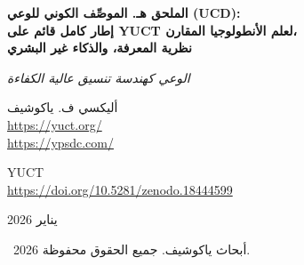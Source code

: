 \documentclass[12pt,a4paper]{article}
\DeclareRobustCommand{\alD}{\texorpdfstring{\ensuremath{\alpha_{\mathrm{D}}}}{alpha_D}}
\DeclareRobustCommand{\beI}{\texorpdfstring{\ensuremath{\beta_{\mathrm{I}}}}{beta_I}}
\DeclareRobustCommand{\gaR}{\texorpdfstring{\ensuremath{\gamma_{\mathrm{R}}}}{gamma_R}}
\newcommand{\eff}{\mathrm{eff}}
\newcommand{\Ke}{K_{\eff}}
\begin{document}
	
	\begin{titlepage}
		\begin{center}
			\vspace*{0cm}
			
			\Huge\textbf{الملحق هـ. الموصِّف الكوني للوعي (UCD):\\ إطار كامل قائم على YUCT لعلم الأنطولوجيا المقارن،\\ نظرية المعرفة، والذكاء غير البشري}
			
			\vspace{1cm}
			
			\small\textit{الوعي كهندسة تنسيق عالية الكفاءة}
			
			\vspace{1cm}
			\Large
			أليكسي ف. ياكوشيف\\
			
			\url{https://yuct.org/}\\
			\url{https://ypsdc.com/}
			
			\vspace{2cm}
			\large YUCT \\ 
			\url{https://doi.org/10.5281/zenodo.18444599}\\
			\vspace{1cm}
			
			\vspace{0cm}
			\large
			يناير 2026
			
			\vspace{6cm}
			\textcopyright~2026 أبحاث ياكوشيف. جميع الحقوق محفوظة.
			
			\newpage
			
			\begin{abstract}
				\noindent
				تقدم هذه الورقة إطار الوعي-المعرفة الموحد الكامل الذي يدمج الموصِّف الكوني للوعي (UCD) مع نظرية ياكوشيف الموحدة للتنسيق (YUCT). بناءً على الرؤية الأساسية بأن الوعي/الذكاء/العقل هو هندسة تنسيق عالية الكفاءة (\(\Ke \gg 1\))، نطور: (1) صياغة رياضية كاملة لثالوث \(\mathcal{D}+\mathcal{I}\cdot\mathcal{R}\) كتفكيك أساسي لأي عامل معرفي؛ (2) ثلاث معاملات طيفية (\alD, \beI, \gaR) للمقارنة الكمية عبر الأنواع والركائز؛ (3) نظرية المعرفة كمعالجة منسقة للمعلومات؛ (4) بروتوكولات تجريبية مفصلة لقياس الوعي في الأنظمة البيولوجية والاصطناعية وخارج الأرض؛ (5) تنبؤات محددة لبحث SETI 2.0 الفيزيائي الفلكي؛ (6) مقارنة مع النظريات الموجودة للوعي (IIT، مساحة العمل الشامل، المعالجة التنبؤية)؛ (7) الآثار الأخلاقية والتطبيقات العملية في الطب وسلامة الذكاء الاصطناعي والأمن السيبراني؛ (8) براهين رياضية كاملة تشمل نظريات حول التسلسل الهرمي المعرفي، والحدود العليا لكفاءة التنسيق، وحدود التعقيد الحسابي. يحل الإطار مشاكل فلسفية طويلة الأمد مع تقديم تنبؤات قابلة للاختبار عبر أكثر من 15 مجالًا تجريبيًا.
			\end{abstract}
			

\end{center}
\end{titlepage}
\end{document}
